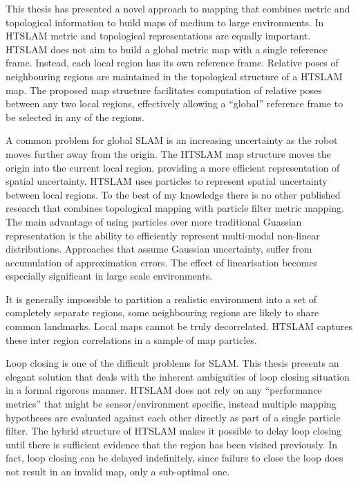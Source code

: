This thesis has presented a novel approach to mapping that combines
metric and topological information to build maps of medium to large
environments. In HTSLAM metric and topological representations are
equally important. HTSLAM does not aim to build a global metric map
with a single reference frame. Instead, each local region has its own
reference frame. Relative poses of neighbouring regions are maintained
in the topological structure of a HTSLAM map. The proposed map
structure facilitates computation of relative poses between any two
local regions, effectively allowing a ``global'' reference frame to be
selected in any of the regions. 


A common problem for global SLAM is an increasing uncertainty as the
robot moves further away from the origin. The HTSLAM map structure
moves the origin into the current local region, providing a more
efficient representation of spatial uncertainty. HTSLAM uses particles
to represent spatial uncertainty between local regions. To the best of
my knowledge there is no other published research that combines
topological mapping with particle filter metric mapping. The main
advantage of using particles over more traditional Guassian
representation is the ability to efficiently represent multi-modal
non-linear distributions. Approaches that assume Gaussian uncertainty,
suffer from accumulation of approximation errors. The effect of
linearisation becomes especially significant in large scale
environments.


It is generally impossible to partition a realistic environment into a
set of completely separate regions, some neighbouring regions are
likely to share common landmarks. Local maps cannot be truly
decorrelated. HTSLAM captures these inter region correlations in a
sample of map particles.

Loop closing is one of the difficult problems for SLAM. This thesis
presents an elegant solution that deals with the inherent ambiguities
of loop closing situation in a formal rigorous manner. HTSLAM does not
rely on any ``performance metrics'' that might be sensor/environment
specific, instead multiple mapping hypotheses are evaluated against
each other directly as part of a single particle filter. The hybrid
structure of HTSLAM makes it possible to delay loop closing until
there is sufficient evidence that the region has been visited
previously. In fact, loop closing can be delayed indefinitely, since
failure to close the loop does not result in an invalid map, only a
sub-optimal one.

